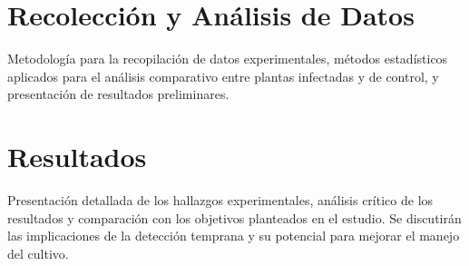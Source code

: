 \section{Recolección y Análisis de Datos}
Metodología para la recopilación de datos experimentales, métodos estadísticos aplicados para el análisis comparativo entre plantas infectadas y de control, y presentación de resultados preliminares.

\section{Resultados}
Presentación detallada de los hallazgos experimentales, análisis crítico de los resultados y comparación con los objetivos planteados en el estudio. Se discutirán las implicaciones de la detección temprana y su potencial para mejorar el manejo del cultivo.